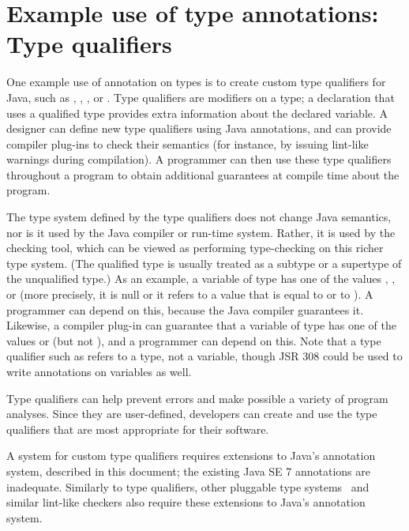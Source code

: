 \documentclass[10pt]{article}
\begin{document}
\section{Example use of type annotations:  Type qualifiers\label{type-qualifiers}}

One example use of annotation on types is to create custom type qualifiers
for Java,
such as , , , or .
Type qualifiers are modifiers on a type; a declaration that uses a
qualified type provides extra
information about the declared variable.
A designer can define new type
qualifiers using Java annotations, and can provide compiler plug-ins to check
their semantics (for instance, by issuing lint-like warnings during
compilation).
A programmer can then use these type qualifiers
throughout a program to obtain additional guarantees at compile time
about the program.

The type system defined by the type qualifiers does not change Java
semantics, nor is it used by the Java compiler or run-time system.  Rather,
it is used by the checking tool, which can be viewed as performing
type-checking on this richer type system.  (The qualified type is usually
treated as a subtype or a supertype of the unqualified type.)
As an example, a variable of type  has one of the values
, , or  (more precisely, it is null or it
refers to a value that is equal to  or to \@).  A
programmer can depend on this, because the Java compiler guarantees it.
Likewise, a compiler plug-in can guarantee that a variable of type
 has one of the values  or 
(but not ), and a programmer can depend on this.  Note that a
type qualifier such as  refers to a type, not a variable,
though JSR 308 could be used to write annotations on variables as well.

Type qualifiers can help prevent errors and make possible a variety of
program analyses.  Since they are user-defined, developers can create
and use the type qualifiers that are most appropriate for their
software.

A system for custom type qualifiers requires
extensions to Java's annotation system, described in this document; the
existing Java SE 7 annotations are inadequate.
Similarly to type qualifiers, other pluggable type
systems~\cite{Bracha2004} and similar lint-like checkers also require these
extensions to Java's annotation system.
\end{document}
